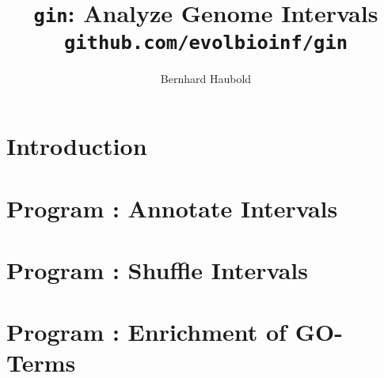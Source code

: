 \documentclass[a4paper]{report}
\begin{document}
\pagestyle{noweb}

\title{\texttt{gin}: Analyze Genome Intervals\\
\small\texttt{github.com/evolbioinf/gin}}
\author{Bernhard Haubold}
\maketitle
\tableofcontents

\chapter{Introduction}

\chapter{Program : Annotate Intervals}\label{ch:an}

\chapter{Program : Shuffle Intervals}\label{ch:sh}

\chapter{Program : Enrichment of GO-Terms}\label{ch:eg}

% 
\end{document}
